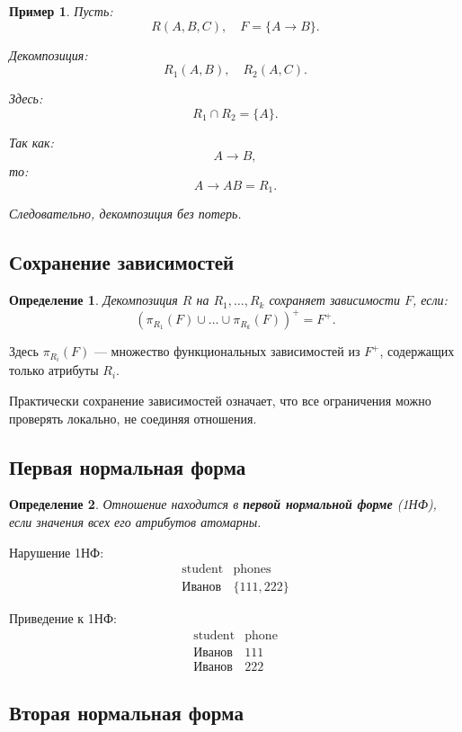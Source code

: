 \documentclass[12pt,a4paper]{article}
\newtheorem{definition}{Определение}[section]
\newtheorem{example}{Пример}[section]
\theoremstyle{remark}
\begin{document}
\begin{example}
Пусть:
\[
R(A,B,C),
\quad F=\{A \to B\}.
\]

Декомпозиция:
\[
R_1(A,B),
\quad R_2(A,C).
\]

Здесь:
\[
R_1 \cap R_2 = \{A\}.
\]

Так как:
\[
A \to B,
\]
то:
\[
A \to AB = R_1.
\]

Следовательно, декомпозиция без потерь.
\end{example}

\subsection{Сохранение зависимостей}

\begin{definition}
Декомпозиция $R$ на $R_1,\dots,R_k$ сохраняет зависимости $F$, если:
\[
\left(
\pi_{R_1}(F) \cup \dots \cup \pi_{R_k}(F)
\right)^+
=
F^+.
\]
\end{definition}

Здесь $\pi_{R_i}(F)$ --- множество функциональных зависимостей из $F^+$, содержащих только атрибуты $R_i$.

Практически сохранение зависимостей означает, что все ограничения можно проверять локально, не соединяя отношения.

\subsection{Первая нормальная форма}

\begin{definition}
Отношение находится в \textbf{первой нормальной форме} (1НФ), если значения всех его атрибутов атомарны.
\end{definition}

Нарушение 1НФ:
\[
\begin{array}{c|c}
\text{student} & \text{phones} \\
\hline
\text{Иванов} & \{111,222\}
\end{array}
\]

Приведение к 1НФ:
\[
\begin{array}{c|c}
\text{student} & \text{phone} \\
\hline
\text{Иванов} & 111 \\
\text{Иванов} & 222
\end{array}
\]

\subsection{Вторая нормальная форма}
\end{document}
